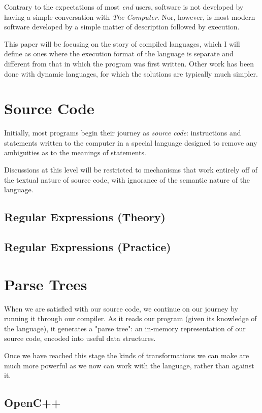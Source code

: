 \documentclass[12pt]{article}
\begin{document}
Contrary to the expectations of most {\em end} users, software is not developed by having a simple conversation with {\em The Computer}. Nor, however, is most modern software developed by a simple matter of description followed by execution.

This paper will be focusing on the story of compiled languages, which I will define as ones where the execution format of the language is separate and different from that in which the program was first written. Other work has been done with dynamic languages, for which the solutions are typically much simpler.

\section{Source Code}

Initially, most programs begin their journey as {\em source code}: instructions and statements written to the computer in a special language designed to remove any ambiguities as to the meanings of statements.

Discussions at this level will be restricted to mechanisms that work entirely off of the textual nature of source code, with ignorance of the semantic nature of the language.

\subsection{Regular Expressions (Theory)}

\subsection{Regular Expressions (Practice)}

\section{Parse Trees}

When we are satisfied with our source code, we continue on our journey by running it through our compiler. As it reads our program (given its knowledge of the language), it generates a "parse tree": an in-memory representation of our source code, encoded into useful data structures.

Once we have reached this stage the kinds of transformations we can make are much more powerful as we now can work with the language, rather than against it.

\subsection{OpenC++}
\end{document}
